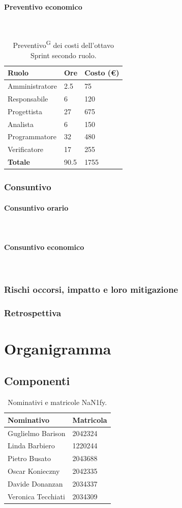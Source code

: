 \documentclass[8pt]{article}
\newcommand{\glossterm}[1]{#1\textsuperscript{G}} %
\newcommand{\subsubsubsection}[1]{\paragraph{#1}\mbox{}\\}
\begin{document}
\subsubsubsection{Preventivo economico}
    \begin{table}[ht!]
	\centering
	\begin{tabular}{p{4cm} p{1cm} p{2cm}}
        \toprule
        \textbf{Ruolo} & \textbf{Ore} & \textbf{Costo (€)} \\
        \midrule
        Amministratore & 2.5  & 75   \\
        Responsabile   & 6  & 120 \\
        Progettista    & 27 & 675 \\
        Analista       & 6 & 150 \\
        Programmatore  & 32 & 480 \\
        Verificatore   & 17 & 255 \\
        \bottomrule
        \textbf{Totale} & 90.5 & 1755
    \end{tabular}
    \caption{\glossterm{Preventivo} dei costi dell'ottavo Sprint secondo ruolo.}
	\label{table:Preventivo dei costi dell'ottavo Sprint secondo ruolo}
\end{table}
\subsubsection{Consuntivo}
\subsubsubsection{Consuntivo orario}
\subsubsubsection{Consuntivo economico}
\subsubsection{Rischi occorsi, impatto e loro mitigazione}
\subsubsection{Retrospettiva}
\newpage
\section{Organigramma} \label{sec:organigramma}
\subsection{Componenti}
\begin{table}[ht!]
	\centering
	\begin{tabular}{p{3cm} p{3cm}}
		\toprule
		\textbf{Nominativo} & \textbf{Matricola} \\
		\midrule
		Guglielmo Barison & 2042324 \\
		Linda Barbiero &  1220244 \\
		Pietro Busato & 2043688 \\
		Oscar Konieczny & 2042335 \\
		Davide Donanzan & 2034337 \\
		Veronica Tecchiati & 2034309 \\
		\bottomrule
	\end{tabular}
	\caption{Nominativi e matricole NaN1fy.}
	\label{table:Nominativi e matricole NaN1fy}
\end{table}
\end{document}

